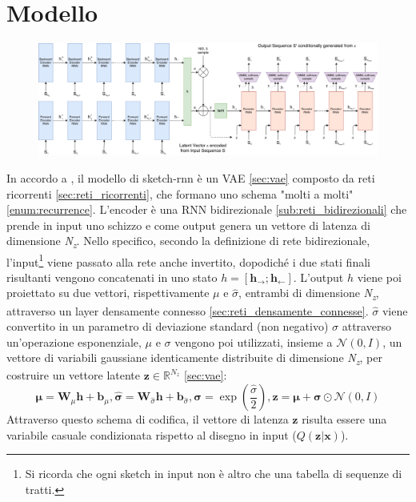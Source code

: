 \section{Modello} %
\label{sec:modello}
\begin{figure}[ht]
	\centering
	\includegraphics[width=\linewidth]{img/sketch_model.png}
\end{figure}

In accordo a \cite{sketchrnn}, il modello di sketch-rnn è un VAE \ref{sec:vae} composto da reti ricorrenti \ref{sec:reti_ricorrenti}, che formano uno schema "molti a molti" \ref{enum:recurrence}. L'encoder è una RNN bidirezionale \ref{sub:reti_bidirezionali} che prende in input uno schizzo e come output genera un vettore di latenza di dimensione \textit{N\textsubscript{z}}. Nello specifico, secondo la definizione di rete bidirezionale, l'input\footnote{Si ricorda che ogni sketch in input non è altro che una tabella di sequenze di tratti.} viene passato alla rete anche invertito, dopodiché i due stati finali risultanti vengono concatenati in uno stato $h = [\boldsymbol{h_\rightarrow} ; \boldsymbol{h_\leftarrow}]$. L'output $h$ viene poi proiettato su due vettori, rispettivamente $\mu$ e $\hat\sigma$, entrambi di dimensione \textit{N\textsubscript{z}}, attraverso un layer densamente connesso \ref{sec:reti_densamente_connesse}. $\hat\sigma$ viene convertito in un parametro di deviazione standard (non negativo) $\sigma$ attraverso un'operazione esponenziale, $\mu$ e $\sigma$ vengono poi utilizzati, insieme a $\mathcal{N}(0, I)$, un vettore di variabili gaussiane identicamente distribuite di dimensione \textit{N\textsubscript{z}}, per costruire un vettore latente $\boldsymbol{z} \in \mathbb{R}^{N_z}$ \ref{sec:vae}:
\begin{equation}
	\label{repar_trick}
	\boldsymbol{\mu} = \boldsymbol{W}_\mu \boldsymbol{h} + \boldsymbol{b}_\mu, \boldsymbol{\hat\sigma} = \boldsymbol{W}_{\hat\sigma} \boldsymbol{h} + \boldsymbol{b}_{\hat\sigma}, \boldsymbol{\sigma} = \exp (\frac{\hat\sigma}{2}), \boldsymbol{z} = \boldsymbol{\mu} + \boldsymbol{\sigma} \odot \mathcal{N}(0, I)
\end{equation}
Attraverso questo schema di codifica, il vettore di latenza $\boldsymbol{z}$ risulta essere una variabile casuale condizionata rispetto al disegno in input ($Q(\boldsymbol{z} | \boldsymbol{x})$).


